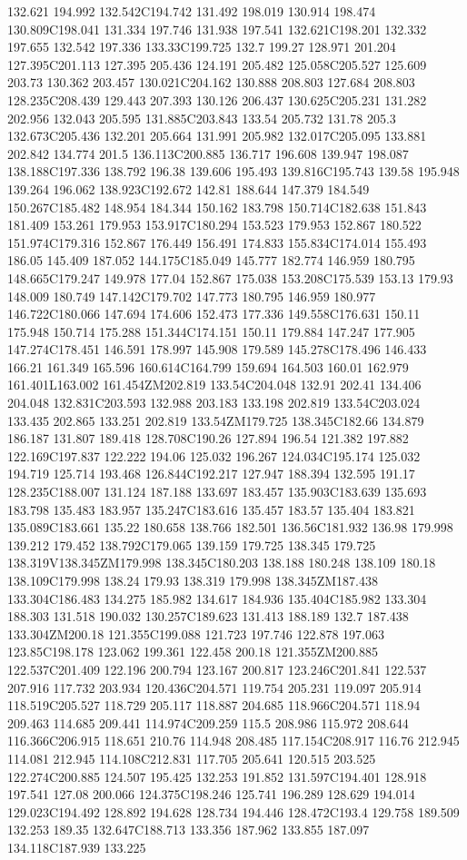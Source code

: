 132.621 194.992 132.542C194.742 131.492 198.019 130.914 198.474 130.809C198.041 131.334 197.746 131.938 197.541 132.621C198.201 132.332 197.655 132.542 197.336 133.33C199.725 132.7 199.27 128.971 201.204 127.395C201.113 127.395 205.436 124.191 205.482 125.058C205.527 125.609 203.73 130.362 203.457 130.021C204.162 130.888 208.803 127.684 208.803 128.235C208.439 129.443 207.393 130.126 206.437 130.625C205.231 131.282 202.956 132.043 205.595 131.885C203.843 133.54 205.732 131.78 205.3 132.673C205.436 132.201 205.664 131.991 205.982 132.017C205.095 133.881 202.842 134.774 201.5 136.113C200.885 136.717 196.608 139.947 198.087 138.188C197.336 138.792 196.38 139.606 195.493 139.816C195.743 139.58 195.948 139.264 196.062 138.923C192.672 142.81 188.644 147.379 184.549 150.267C185.482 148.954 184.344 150.162 183.798 150.714C182.638 151.843 181.409 153.261 179.953 153.917C180.294 153.523 179.953 152.867 180.522 151.974C179.316 152.867 176.449 156.491 174.833 155.834C174.014 155.493 186.05 145.409 187.052 144.175C185.049 145.777 182.774 146.959 180.795 148.665C179.247 149.978 177.04 152.867 175.038 153.208C175.539 153.13 179.93 148.009 180.749 147.142C179.702 147.773 180.795 146.959 180.977 146.722C180.066 147.694 174.606 152.473 177.336 149.558C176.631 150.11 175.948 150.714 175.288 151.344C174.151 150.11 179.884 147.247 177.905 147.274C178.451 146.591 178.997 145.908 179.589 145.278C178.496 146.433 166.21 161.349 165.596 160.614C164.799 159.694 164.503 160.01 162.979 161.401L163.002 161.454ZM202.819 133.54C204.048 132.91 202.41 134.406 204.048 132.831C203.593 132.988 203.183 133.198 202.819 133.54C203.024 133.435 202.865 133.251 202.819 133.54ZM179.725 138.345C182.66 134.879 186.187 131.807 189.418 128.708C190.26 127.894 196.54 121.382 197.882 122.169C197.837 122.222 194.06 125.032 196.267 124.034C195.174 125.032 194.719 125.714 193.468 126.844C192.217 127.947 188.394 132.595 191.17 128.235C188.007 131.124 187.188 133.697 183.457 135.903C183.639 135.693 183.798 135.483 183.957 135.247C183.616 135.457 183.57 135.404 183.821 135.089C183.661 135.22 180.658 138.766 182.501 136.56C181.932 136.98 179.998 139.212 179.452 138.792C179.065 139.159 179.725 138.345 179.725 138.319V138.345ZM179.998 138.345C180.203 138.188 180.248 138.109 180.18 138.109C179.998 138.24 179.93 138.319 179.998 138.345ZM187.438 133.304C186.483 134.275 185.982 134.617 184.936 135.404C185.982 133.304 188.303 131.518 190.032 130.257C189.623 131.413 188.189 132.7 187.438 133.304ZM200.18 121.355C199.088 121.723 197.746 122.878 197.063 123.85C198.178 123.062 199.361 122.458 200.18 121.355ZM200.885 122.537C201.409 122.196 200.794 123.167 200.817 123.246C201.841 122.537 207.916 117.732 203.934 120.436C204.571 119.754 205.231 119.097 205.914 118.519C205.527 118.729 205.117 118.887 204.685 118.966C204.571 118.94 209.463 114.685 209.441 114.974C209.259 115.5 208.986 115.972 208.644 116.366C206.915 118.651 210.76 114.948 208.485 117.154C208.917 116.76 212.945 114.081 212.945 114.108C212.831 117.705 205.641 120.515 203.525 122.274C200.885 124.507 195.425 132.253 191.852 131.597C194.401 128.918 197.541 127.08 200.066 124.375C198.246 125.741 196.289 128.629 194.014 129.023C194.492 128.892 194.628 128.734 194.446 128.472C193.4 129.758 189.509 132.253 189.35 132.647C188.713 133.356 187.962 133.855 187.097 134.118C187.939 133.225 